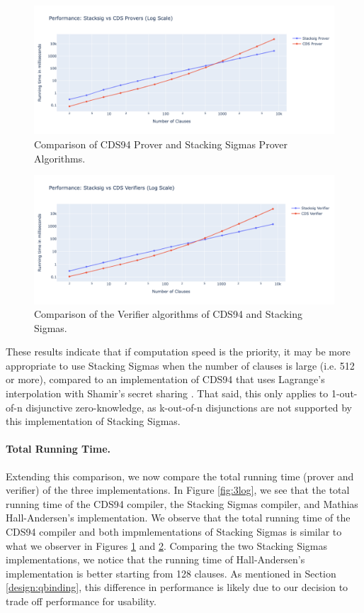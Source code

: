 \begin{figure}[h]
  \centering
  \includegraphics[width=0.9\linewidth]{../assets/plots/vs_provers.png}
  \caption{Comparison of CDS94 Prover and Stacking Sigmas Prover Algorithms.}
  \label{fig:provers_vs}
\end{figure}

\begin{figure}[H]
  \centering
  \includegraphics[width=\linewidth]{../assets/plots/vs_verifiers.png}
  \caption{Comparison of the Verifier algorithms of CDS94 and Stacking Sigmas.}
  \label{fig:verifiers_vs}
\end{figure}

These results indicate that if computation speed is the priority,
 it may be more appropriate to use Stacking Sigmas 
when the number of clauses is large (i.e. 512 or more), compared to an implementation of 
CDS94 that uses Lagrange's interpolation \cite{lagrange} with Shamir's secret sharing 
\cite{DBLP:journals/cacm/Shamir79}. That said, this only applies to 1-out-of-n 
disjunctive zero-knowledge, as k-out-of-n disjunctions are not supported by this 
implementation of Stacking Sigmas.

\paragraph{Total Running Time.} Extending this comparison, we now compare the total running time (prover and verifier)
of the three implementations. In Figure \ref{fig:3log}, we see that the total running time of the CDS94 compiler, the Stacking Sigmas compiler, and Mathias Hall-Andersen's 
implementation. We observe that the total running time of the CDS94 compiler and both 
impmlementations of Stacking Sigmas is similar to what we observer in 
Figures \ref{fig:provers_vs} and \ref{fig:verifiers_vs}. Comparing the two 
Stacking Sigmas implementations, we notice that the running time of Hall-Andersen's 
implementation is better starting from 128 clauses. As mentioned in Section 
\ref{design:qbinding}, this difference in performance is likely due to our 
decision to trade off performance for usability.


